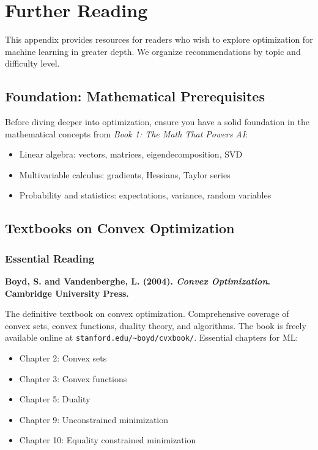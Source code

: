 \documentclass[../main.tex]{subfiles}
\begin{document}
\chapter*{Further Reading}
\label{app:further-reading}

This appendix provides resources for readers who wish to explore optimization for machine learning in greater depth. We organize recommendations by topic and difficulty level.

\section{Foundation: Mathematical Prerequisites}

Before diving deeper into optimization, ensure you have a solid foundation in the mathematical concepts from \emph{Book 1: The Math That Powers AI}:
\begin{itemize}
    \item Linear algebra: vectors, matrices, eigendecomposition, SVD
    \item Multivariable calculus: gradients, Hessians, Taylor series
    \item Probability and statistics: expectations, variance, random variables
\end{itemize}

\section{Textbooks on Convex Optimization}

\subsection{Essential Reading}

\textbf{Boyd, S. and Vandenberghe, L. (2004). \emph{Convex Optimization}. Cambridge University Press.}

The definitive textbook on convex optimization. Comprehensive coverage of convex sets, convex functions, duality theory, and algorithms. The book is freely available online at \texttt{stanford.edu/\textasciitilde boyd/cvxbook/}. Essential chapters for ML:
\begin{itemize}
    \item Chapter 2: Convex sets
    \item Chapter 3: Convex functions
    \item Chapter 5: Duality
    \item Chapter 9: Unconstrained minimization
    \item Chapter 10: Equality constrained minimization
\end{itemize}
\end{document}

